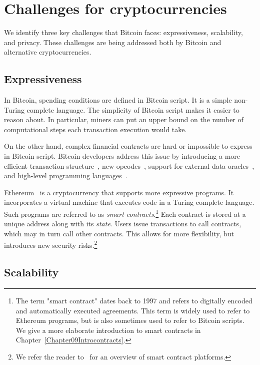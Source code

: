 \section{Challenges for cryptocurrencies}

We identify three key challenges that Bitcoin faces: expressiveness, scalability, and privacy.
These challenges are being addressed both by Bitcoin and alternative cryptocurrencies.


\subsection{Expressiveness}

In Bitcoin, spending conditions are defined in Bitcoin script.
It is a simple non-Turing complete language.
The simplicity of Bitcoin script makes it easier to reason about.
In particular, miners can put an upper bound on the number of computational steps each transaction execution would take.

On the other hand, complex financial contracts are hard or impossible to express in Bitcoin script.
Bitcoin developers address this issue by introducing a more efficient transaction structure~\cite{Wuille2020}, new opcodes~\cite{Rubin2020}, support for external data oracles~\cite{Dryja}, and high-level programming languages~\cite{OConnor2017, Wuille2019}.

Ethereum~\cite{Buterin2014, Wood2014} is a cryptocurrency that supports more expressive programs.
It incorporates a virtual machine that executes code in a Turing complete language.
Such programs are referred to as \textit{smart contracts}.\footnote{The term "smart contract" dates back to 1997 and refers to digitally encoded and automatically executed agreements. This term is widely used to refer to Ethereum programs, but is also sometimes used to refer to Bitcoin scripts. We give a more elaborate introduction to smart contracts in Chapter~\ref{Chapter09Introcontracts}.}
Each contract is stored at a unique address along with its \textit{state}.
Users issue transactions to call contracts, which may in turn call other contracts.
This allows for more flexibility, but introduces new security risks.\footnote{We refer the reader to~\cite{Bartoletti2017} for an overview of smart contract platforms.}


\subsection{Scalability}

